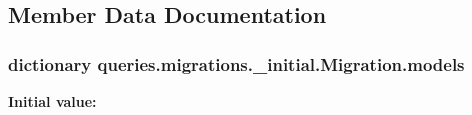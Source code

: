 \subsection{Member Data Documentation}
\hypertarget{classqueries_1_1migrations_1_10001__initial_1_1_migration_a736c0d4a7a2e6f3983ce60a3087ee085}{
\subsubsection[{models}]{\setlength{\rightskip}{0pt plus 5cm}dictionary queries.\-migrations.\-\_\-initial.\-Migration.\-models\hspace{0.3cm}{\ttfamily [static]}}}\label{classqueries_1_1migrations_1_10001__initial_1_1_migration_a736c0d4a7a2e6f3983ce60a3087ee085}
{\bfseries Initial value\-:}
